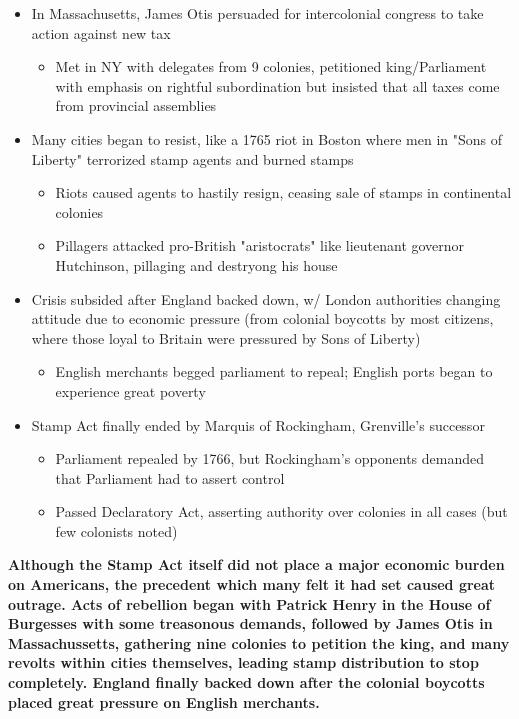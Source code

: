 \documentclass[a4paper]{article}
\begin{document}
{\begin{itemize}
\begin{itemize}
\begin{itemize}
                \item Virginians, like other Brits, should pay no taxes apart from those induced by their own representatives
            \end{itemize}
            \item Burgesses rejected most extreme of resolutions, but kept most as "Virginia Resolves"
        \end{itemize}
        \item In Massachusetts, James Otis persuaded for intercolonial congress to take action against new tax
        \begin{itemize}
            \item Met in NY with delegates from 9 colonies, petitioned king/Parliament with emphasis on rightful subordination but insisted that all taxes come from provincial assemblies
        \end{itemize}
        \item Many cities began to resist, like a 1765 riot in Boston where men in "Sons of Liberty" terrorized stamp agents and burned stamps
        \begin{itemize}
            \item Riots caused agents to hastily resign, ceasing sale of stamps in continental colonies
            \item Pillagers attacked pro-British "aristocrats" like lieutenant governor Hutchinson, pillaging and destryong his house
        \end{itemize}
        \item Crisis subsided after England backed down, w/ London authorities changing attitude due to economic pressure (from colonial boycotts by most citizens, where those loyal to Britain were pressured by Sons of Liberty)
        \begin{itemize}
            \item English merchants begged parliament to repeal; English ports began to experience great poverty
        \end{itemize}
        \item Stamp Act finally ended by Marquis of Rockingham, Grenville's successor
        \begin{itemize}
            \item Parliament repealed by 1766, but Rockingham's opponents demanded that Parliament had to assert control
            \item Passed Declaratory Act, asserting authority over colonies in all cases (but few colonists noted)
        \end{itemize}
    \end{itemize}
    \textbf{Although the Stamp Act itself did not place a major economic burden on Americans, the precedent which many felt it had set caused great outrage. Acts of rebellion began with Patrick Henry in the House of Burgesses with some treasonous demands, followed by James Otis in Massachussetts, gathering nine colonies to petition the king, and many revolts within cities themselves, leading stamp distribution to stop completely. England finally backed down after the colonial boycotts placed great pressure on English merchants.}}
\end{document}
